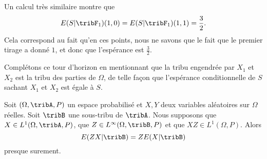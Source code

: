 \begin{example}
	Un calcul très similaire montre que
	\begin{equation}
		E(S|\tribF_1)(1,0)=E(S|\tribF_1)(1,1)=\frac{ 3 }{2}.
	\end{equation}
	Cela correspond au fait qu'en ces points, nous ne savons que le fait que le premier tirage a donné \( 1\), et donc que l'espérance est \( \frac{ 3 }{2}\).

	Complétons ce tour d'horizon en mentionnant que la tribu engendrée par \( X_1\) et \( X_2\) est la tribu des parties de \( \Omega\), de telle façon que l'espérance conditionnelle de \( S\) sachant \( X_1\) et \( X_2\) est égale à \( S\).
\end{example}

\begin{proposition}   \label{PropRNBtfql}
	Soit \( (\Omega,\tribA,P)\) un espace probabilisé et \( X,Y\) deux variables aléatoires sur \( \Omega\) réelles. Soit \( \tribB\) une sous-tribu de \( \tribA\). Nous supposons que \( X\in L^1(\Omega,\tribA,P)\), que \( Z\in L^{\infty}(\Omega,\tribB,P)\) et que \( XZ\in L^1(\Omega,P)\). Alors
	\begin{equation}
		E(ZX|\tribB)=ZE(X|\tribB)
	\end{equation}
	presque surement.
\end{proposition}

